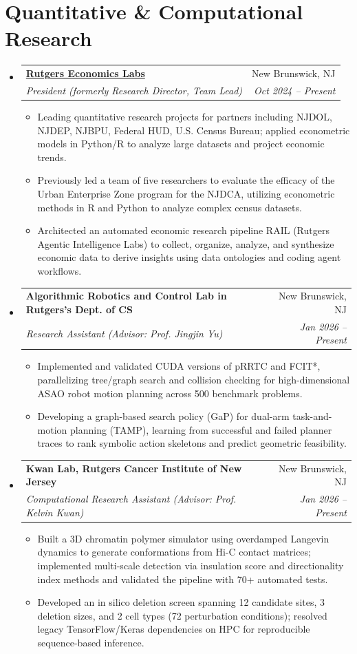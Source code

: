 \documentclass[letterpaper,11pt]{article}
\makeatletter
\newcommand{\resumeItem}[1]{
  \item\small{
    {#1 \vspace{-2pt}}
  }
}
\newcommand{\resumeSubheading}[4]{
  \vspace{-2pt}\item
    \begin{tabular*}{0.97\textwidth}[t]{l@{\extracolsep{\fill}}r}
      \textbf{#1} & #2 \\
      \textit{\small#3} & \textit{\small #4} \\
    \end{tabular*}\vspace{-7pt}
}
\newcommand{\resumeSubHeadingListStart}{\begin{itemize}[leftmargin=0.15in, label={}]}
\newcommand{\resumeSubHeadingListEnd}{\end{itemize}}
\newcommand{\resumeItemListStart}{\begin{itemize}}
\newcommand{\resumeItemListEnd}{\end{itemize}\vspace{-5pt}}
\makeatother
\begin{document}
\section{Quantitative \& Computational Research}
  \resumeSubHeadingListStart
  \resumeSubheading
      {\href{https://rutgerseconomics.org}{Rutgers Economics Labs}}{New Brunswick, NJ}
      {President (formerly Research Director, Team Lead)}{Oct 2024 -- Present}
      \resumeItemListStart
        \resumeItem{Leading quantitative research projects for partners including NJDOL, NJDEP, NJBPU, Federal HUD, U.S. Census Bureau; applied econometric models in Python/R to analyze large datasets and project economic trends.}
        \resumeItem{Previously led a team of five researchers to evaluate the efficacy of the Urban Enterprise Zone program for the NJDCA, utilizing econometric methods in R and Python to analyze complex census datasets.}
        \resumeItem{Architected an automated economic research pipeline RAIL (Rutgers Agentic Intelligence Labs) to collect, organize, analyze, and synthesize economic data to derive insights using data ontologies and coding agent workflows.}
      \resumeItemListEnd
    \resumeSubheading
      {Algorithmic Robotics and Control Lab in Rutgers's Dept. of CS}{New Brunswick, NJ}
      {Research Assistant (Advisor: Prof. Jingjin Yu)}{Jan 2026 -- Present}
      \resumeItemListStart
        \resumeItem{Implemented and validated CUDA versions of pRRTC and FCIT*, parallelizing tree/graph search and collision checking for high-dimensional ASAO robot motion planning across 500 benchmark problems.}
        \resumeItem{Developing a graph-based search policy (GaP) for dual-arm task-and-motion planning (TAMP), learning from successful and failed planner traces to rank symbolic action skeletons and predict geometric feasibility.}
      \resumeItemListEnd
    \resumeSubheading
        {Kwan Lab, Rutgers Cancer Institute of New Jersey}{New Brunswick, NJ}
        {Computational Research Assistant (Advisor: Prof. Kelvin Kwan)}{Jan 2026 -- Present}
        \resumeItemListStart
            \resumeItem{Built a 3D chromatin polymer simulator using overdamped Langevin dynamics to generate conformations from Hi-C contact matrices; implemented multi-scale detection via insulation score and directionality index methods and validated the pipeline with 70+ automated tests.}
            \resumeItem{Developed an in silico deletion screen spanning 12 candidate sites, 3 deletion sizes, and 2 cell types (72 perturbation conditions); resolved legacy TensorFlow/Keras dependencies on HPC for reproducible sequence-based inference.}
    \resumeItemListEnd
  \resumeSubHeadingListEnd
\end{document}
